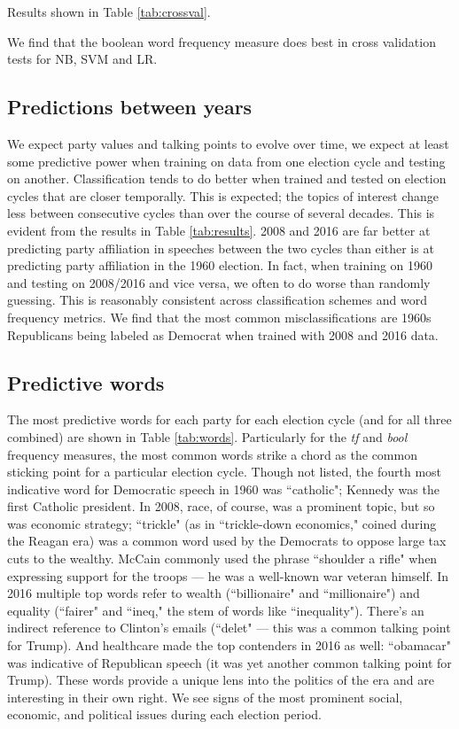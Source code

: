 \documentclass[aps, prl, reprint, showpacs]{revtex4-1}
\begin{document}
Results shown in Table \ref{tab:crossval}.

We find that the boolean word frequency measure does best in cross validation tests for NB, SVM and LR.

\subsection{Predictions between years}
We expect party values and talking points to evolve over time, we expect at least some predictive power when training on data from one election cycle and testing on another. Classification tends to do better when trained and tested on election cycles that are closer temporally. This is expected; the topics of interest change less between consecutive cycles than over the course of several decades. This is evident from the results in Table \ref{tab:results}. 2008 and 2016 are far better at predicting party affiliation in speeches between the two cycles than either is at predicting party affiliation in the 1960 election. In fact, when training on 1960 and testing on 2008/2016 and vice versa, we often to do worse than randomly guessing. This is reasonably consistent across classification schemes and word frequency metrics. We find that the most common misclassifications are 1960s Republicans being labeled as Democrat when trained with 2008 and 2016 data.

\subsection{Predictive words}

The most predictive words for each party for each election cycle (and for all three combined) are shown in Table \ref{tab:words}. Particularly for the \textit{tf} and \textit{bool} frequency measures, the most common words strike a chord as the common sticking point for a particular election cycle. Though not listed, the fourth most indicative word for Democratic speech in 1960 was ``catholic"; Kennedy was the first Catholic president. In 2008, race, of course, was a prominent topic, but so was economic strategy; ``trickle" (as in ``trickle-down economics," coined during the Reagan era) was a common word used by the Democrats to oppose large tax cuts to the wealthy. McCain commonly used the phrase ``shoulder a rifle" when expressing support for the troops --- he was a well-known war veteran himself. In 2016 multiple top words refer to wealth (``billionaire" and ``millionaire") and equality (``fairer" and ``ineq," the stem of words like ``inequality"). There's an indirect reference to Clinton's emails (``delet" --- this was a common talking point for Trump). And healthcare made the top contenders in 2016 as well: ``obamacar" was indicative of Republican speech (it was yet another common talking point for Trump). These words provide a unique lens into the politics of the era and are interesting in their own right. We see signs of the most prominent social, economic, and political issues during each election period.
\end{document}
